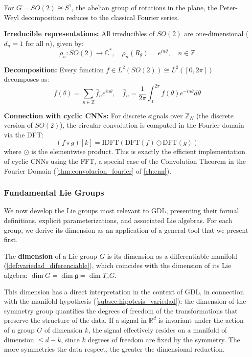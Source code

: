 \begin{example}\label{ex:peter_weyl_so2_detallado}
	For $G = SO(2) \cong S^1$, the abelian group of rotations in the plane, the Peter-Weyl decomposition reduces to the classical Fourier series.

	\textbf{Irreducible representations:} All irreducibles of $SO(2)$ are one-dimensional ($d_n = 1$ for all $n$), given by:
	\[
		\rho_n: SO(2) \to \mathbb{C}^*, \quad \rho_n(R_\theta) = e^{in\theta}, \quad n \in \mathbb{Z}
	\]

	\textbf{Decomposition:} Every function $f \in L^2(SO(2)) \cong L^2([0, 2\pi])$ decomposes as:
	\[
		f(\theta) = \sum_{n \in \mathbb{Z}} \hat{f}_n e^{in\theta}, \quad \hat{f}_n = \frac{1}{2\pi} \int_0^{2\pi} f(\theta) e^{-in\theta} d\theta
	\]

	\textbf{Connection with cyclic CNNs:} For discrete signals over $\mathbb{Z}_N$ (the discrete version of $SO(2)$), the circular convolution is computed in the Fourier domain via the DFT:
	\[
		(f \star g)[k] = \text{IDFT}(\text{DFT}(f) \odot \text{DFT}(g))
	\]
	where $\odot$ is the elementwise product. This is exactly the efficient implementation of cyclic CNNs using the FFT, a special case of the Convolution Theorem in the Fourier Domain (\autoref{thm:convolucion_fourier} of \autoref{ch:cnn}).
\end{example}

\subsubsection{Fundamental Lie Groups}\label{subsubsec:grupos_lie_fundamentales}

We now develop the Lie groups most relevant to \gls{GDL}, presenting their formal definitions, explicit parameterizations, and associated Lie algebras. For each group, we derive its dimension as an application of a general tool that we present first.

\begin{remark}\label{rem:dimension_grupo_lie}
The \textbf{dimension} of a Lie group $G$ is its dimension as a differentiable manifold (\autoref{def:variedad_diferenciable}), which coincides with the dimension of its Lie algebra: $\dim G = \dim \mathfrak{g} = \dim T_eG$.

This dimension has a direct interpretation in the context of \gls{GDL}, in connection with the manifold hypothesis (\autoref{subsec:hipotesis_variedad}): the dimension of the symmetry group quantifies the degrees of freedom of the transformations that preserve the structure of the data. If a signal in $\mathbb{R}^d$ is invariant under the action of a group $G$ of dimension $k$, the signal effectively resides on a manifold of dimension $\leq d - k$, since $k$ degrees of freedom are fixed by the symmetry. The more symmetries the data respect, the greater the dimensional reduction.
\end{remark}

